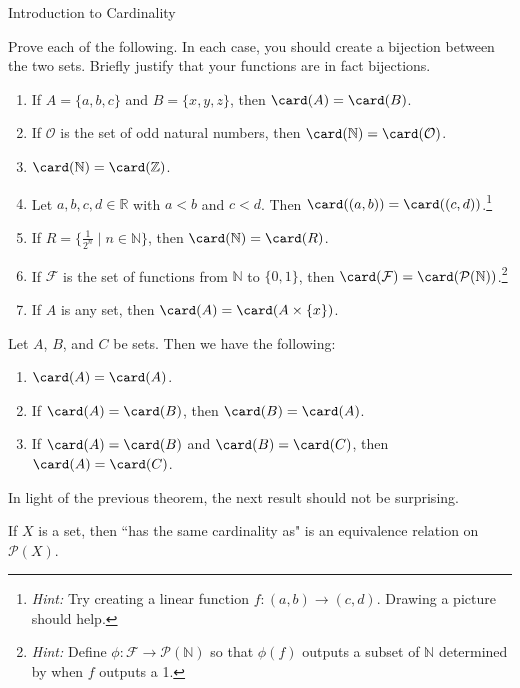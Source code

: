 \begin{section}{Introduction to Cardinality}
\begin{problem}\label{prob:cardinalityPractice}
Prove each of the following. In each case, you should create a bijection between the two sets. Briefly justify that your functions are in fact bijections.
\begin{enumerate}[label=\textrm{(\alph*)}]
\item If $A=\{a,b,c\}$ and $B=\{x,y,z\}$, then $\card(A)=\card(B)$.
\item If $\mathcal{O}$ is the set of odd natural numbers, then $\card(\mathbb{N})=\card(\mathcal{O})$. 
\item $\card(\mathbb{N})=\card(\mathbb{Z})$.
\item Let $a,b,c,d\in\mathbb{R}$ with $a<b$ and $c<d$. Then $\card((a,b))=\card((c,d))$.\footnote{\emph{Hint:} Try creating a linear function $f:(a,b)\to (c,d)$. Drawing a picture should help.}
\item If $R=\{\frac{1}{2^n}\mid n\in \mathbb{N}\}$, then $\card(\mathbb{N})=\card(R)$.
\item If $\mathcal{F}$ is the set of functions from $\mathbb{N}$ to $\{0,1\}$, then $\card(\mathcal{F})=\card(\mathcal{P}(\mathbb{N}))$.\footnote{\emph{Hint:} Define $\phi:\mathcal{F}\to \mathcal{P}(\mathbb{N})$ so that $\phi(f)$ outputs a subset of $\mathbb{N}$ determined by when $f$ outputs a 1.}
\item If $A$ is any set, then $\card(A)=\card(A\times \{x\})$.
\end{enumerate}
\end{problem}

\begin{theorem}
Let $A$, $B$, and $C$ be sets. Then we have the following:
\begin{enumerate}[label=\textrm{(\alph*)}]
\item $\card(A)=\card(A)$.
\item If $\card(A)=\card(B)$, then $\card(B)=\card(A)$.
\item If $\card(A)=\card(B)$ and $\card(B)=\card(C)$, then $\card(A)=\card(C)$.
\end{enumerate}
\end{theorem}

In light of the previous theorem, the next result should not be surprising.

\begin{corollary}
If $X$ is a set, then ``has the same cardinality as" is an equivalence relation on $\mathcal{P}(X)$.
\end{corollary}


\end{section}

